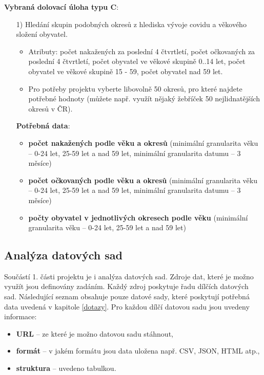 \documentclass[12pt]{article}
\begin{document}
\hspace{1cm}

\textbf{Vybraná dolovací úloha typu C}:
\begin{itemize}
    \item[1)] Hledání skupin podobných okresů z hlediska vývoje covidu a věkového složení obyvatel.
    \begin{itemize}
        \item Atributy: počet nakažených za poslední 4 čtvrtletí, počet očkovaných za poslední 4 čtvrtletí, počet obyvatel ve věkové skupině 0..14 let, počet obyvatel ve věkové skupině 15 - 59, počet obyvatel nad 59 let.
        \item Pro potřeby projektu vyberte libovolně 50 okresů, pro které najdete potřebné hodnoty (můžete např. využít nějaký žebříček 50 nejlidnatějších okresů v ČR).
    \end{itemize}

    \item[] \textbf{Potřebná data}:
    \begin{itemize}
        \item \textbf{počet nakažených podle věku a okresů} (minimální granularita věku -- 0-24 let, 25-59 let a nad 59 let, minimální granularita datumu -- 3 měsíce)
        \item \textbf{počet očkovaných podle věku a okresů} (minimální granularita věku -- 0-24 let, 25-59 let a nad 59 let, minimální granularita datumu -- 3 měsíce)
        \item \textbf{počty obyvatel v jednotlivých okresech podle věku} (minimální granularita věku -- 0-24 let, 25-59 let a nad 59 let)
    \end{itemize}
\end{itemize}

\newpage
\subsection{Analýza datových sad}
Součástí 1. části projektu je i analýza datových sad. Zdroje dat, které je možno využít jsou definovány zadáním. Každý zdroj poskytuje řadu dílčích datových sad. Následující seznam obsahuje pouze datové sady, které poskytují potřebná data uvedená v kapitole \ref{dotazy}. Pro každou dílčí datovou sadu jsou uvedeny informace:
\begin{itemize}
    \item \textbf{URL} -- ze které je možno datovou sadu stáhnout,
    \item \textbf{formát} -- v jakém formátu jsou data uložena např. CSV, JSON, HTML atp.,
    \item \textbf{struktura} -- uvedeno tabulkou.
\end{itemize}
\end{document}
